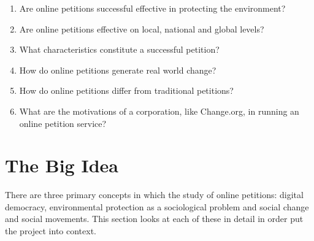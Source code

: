 \begin{enumerate}
    \item Are online petitions successful effective in protecting the environment?
    \item Are online petitions effective on local, national and global levels?
    \item What characteristics constitute a successful petition?
    \item How do online petitions generate real world change?
    \item How do online petitions differ from traditional petitions?
    \item What are the motivations of a corporation, like Change.org, in running an online petition service?
\end{enumerate}


\section{The Big Idea}
\label{sec:bigIdea}
There are three primary concepts in which the study of online petitions: digital democracy, environmental protection as a sociological problem and social change and social movements. This section looks at each of these in detail in order put the project into context.
